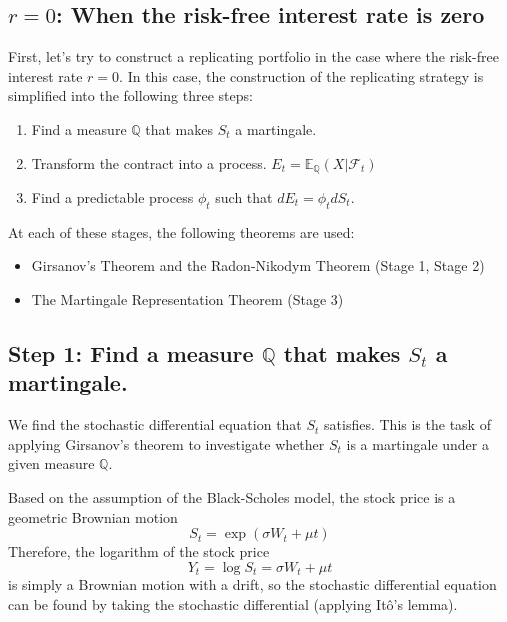 \documentclass[uplatex,a4j,12pt,dvipdfmx]{jsarticle}
\begin{document}
\subsection{$r=0$: When the risk-free interest rate is zero}
First, let's try to construct a replicating portfolio in the case where the risk-free interest rate $r=0$.
In this case, the construction of the replicating strategy is simplified into the following three steps:
\begin{enumerate}
	\item Find a measure $\mathbb{Q}$ that makes $S_{t}$ a martingale.
	\item Transform the contract into a process. $E_{t} = \mathbb{E}_{\mathbb{Q}}( X | \mathcal{F}_{t})$
	\item Find a predictable process $\phi_{t}$ such that $dE_{t} = \phi_{t} d S_{t}$.
\end{enumerate}
At each of these stages, the following theorems are used:
\begin{itemize}
	\item Girsanov's Theorem and the Radon-Nikodym Theorem (Stage 1, Stage 2)
	\item The Martingale Representation Theorem (Stage 3)
\end{itemize}

\subsection{Step 1: Find a measure $\mathbb{Q}$ that makes $S_{t}$ a martingale.}

We find the stochastic differential equation that $S_{t}$ satisfies.
This is the task of applying Girsanov's theorem to investigate whether $S_{t}$ is a martingale under a given measure $\mathbb{Q}$.

Based on the assumption of the Black-Scholes model, the stock price is a geometric Brownian motion
$$S_{t} = \exp (\sigma W_{t} + \mu t)$$
Therefore, the logarithm of the stock price
$$Y_{t} = \log S_{t} = \sigma W_{t} + \mu t$$
is simply a Brownian motion with a drift, so the stochastic differential equation can be found by taking the stochastic differential (applying Itô's lemma).
\end{document}
